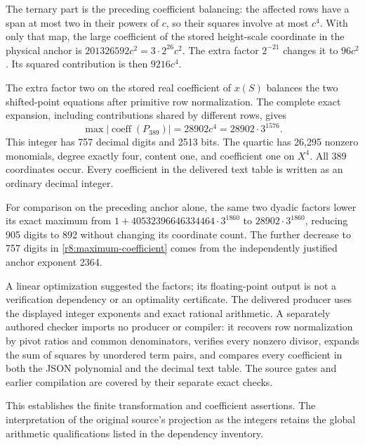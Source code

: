 The ternary part is the preceding coefficient balancing: the affected
rows have a span at most two in their powers of $c$, so their squares
involve at most $c^4$. With only that map, the large coefficient of the
stored height-scale coordinate in the physical anchor is
$201326592c^2=3\cdot2^{26}c^2$. The extra factor $2^{-21}$ changes it
to $96c^2$. Its squared contribution is then $9216c^4$.

The extra factor two on the stored real coefficient of $x(S)$ balances
the two shifted-point equations after primitive row normalization.
The complete exact expansion, including contributions shared by
different rows, gives
\begin{equation}\label{r8:maximum-coefficient}
 \boxed{\max|\operatorname{coeff}(P_{389})|
      =28902c^4=28902\cdot3^{1576}.}
\end{equation}
This integer has 757 decimal digits and 2513 bits. The quartic has
26,295 nonzero monomials, degree exactly four, content one, and
coefficient one on $X^4$. All 389 coordinates occur. Every coefficient
in the delivered text table is written as an ordinary decimal integer.

For comparison on the preceding anchor alone, the same two dyadic
factors lower its exact maximum from
$1+40532396646334464\cdot3^{1860}$ to $28902\cdot3^{1860}$,
reducing 905 digits to 892 without changing its coordinate count.
The further decrease to 757 digits in
\eqref{r8:maximum-coefficient} comes from the independently justified
anchor exponent 2364.

A linear optimization suggested the factors; its floating-point
output is not a verification dependency or an optimality certificate.
The delivered producer uses the displayed integer exponents and exact
rational arithmetic. A separately authored checker imports no producer
or compiler: it recovers row normalization by pivot ratios and common
denominators, verifies every nonzero divisor, expands the sum of squares
by unordered term pairs, and compares every coefficient in both the
JSON polynomial and the decimal text table. The source gates and
earlier compilation are covered by their separate exact checks.

This establishes the finite transformation and coefficient assertions.
The interpretation of the original source's projection as the integers
retains the global arithmetic qualifications listed in the dependency
inventory.
